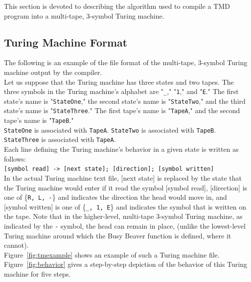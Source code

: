 This section is devoted to describing the algorithm used to compile a TMD program into a multi-tape, 3-symbol Turing machine.

\subsection{Turing Machine Format}

The following is an example of the file format of the multi-tape, 3-symbol Turing machine output by the compiler. \\

Let us suppose that the Turing machine has three states and two tapes. The three symbols in the Turing machine's alphabet are "\texttt{\_}," "\texttt{1}," and "\texttt{E}." The first state's name is "\texttt{StateOne}," the second state's name is "\texttt{StateTwo}," and the third state's name is "\texttt{StateThree}." The first tape's name is "\texttt{TapeA}," and the second tape's name is "\texttt{TapeB}." \\

\texttt{StateOne} is associated with \texttt{TapeA}. \texttt{StateTwo} is associated with \texttt{TapeB}. \texttt{StateThree} is associated with \texttt{TapeA}. \\

Each line defining the Turing machine's behavior in a given state is written as follows: \\

\texttt{[symbol read] -> [next state]; [direction]; [symbol written]} \\

In the actual Turing machine text file, [next state] is replaced by the state that the Turing machine would enter if it read the symbol [symbol read], [direction] is one of \{\texttt{R, L, -}\} and indicates the direction the head would move in, and [symbol written] is one of \{\texttt{\_, 1, E}\} and indicates the symbol that is written on the tape. Note that in the higher-level, multi-tape 3-symbol Turing machine, as indicated by the \texttt{-} symbol, the head can remain in place, (unlike the lowest-level Turing machine around which the Busy Beaver function is defined, where it cannot). \\

Figure~\ref{fig:tmexample} shows an example of such a Turing machine file. Figure~\ref{fig:behavior} gives a step-by-step depiction of the behavior of this Turing machine for five steps. \\

